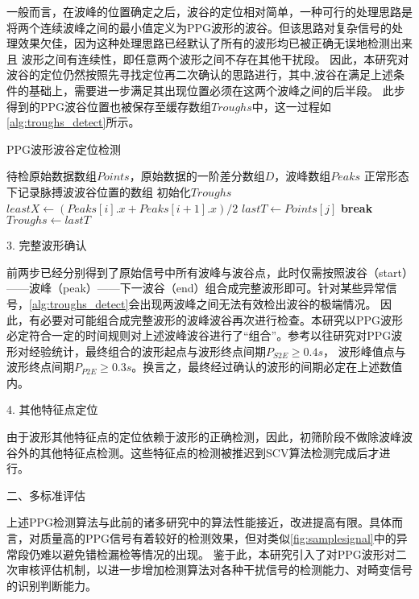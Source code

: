 一般而言，在波峰的位置确定之后，波谷的定位相对简单，一种可行的处理思路是将两个连续波峰之间的最小值定义为PPG波形的波谷。但该思路对复杂信号的处理效果欠佳，因为这种处理思路已经默认了所有的波形均已被正确无误地检测出来且
波形之间有连续性，即任意两个波形之间不存在其他干扰段。
因此，本研究对波谷的定位仍然按照先寻找定位再二次确认的思路进行，其中,波谷在满足上述条件的基础上，需要进一步满足其出现位置必须在这两个波峰之间的后半段。
此步得到的PPG波谷位置也被保存至缓存数组$Troughs$中，这一过程如\autoref{alg:troughs_detect}所示。
\begin{breakablealgorithm}
    \caption{PPG波形波谷定位检测}
    \label{alg:troughs_detect}
    \begin{algorithmic}[1] %
        \Require 待检原始数据数组$Points$，原始数据的一阶差分数组$D$，波峰数组$Peaks$
        \Ensure 正常形态下记录脉搏波波谷位置的数组
            \State 初始化$Troughs$
                \State $leastX \gets (Peaks[i].x + Peaks[i+1].x )/2$
                            \State $lastT \gets Points[j]$
                            \State \textbf{break}
                        \EndIf
                    \EndFor
                \State $Troughs \gets lastT$
            \EndFor
            \State {}
        \EndFunction
    \end{algorithmic}
\end{breakablealgorithm}

3. 完整波形确认

前两步已经分别得到了原始信号中所有波峰与波谷点，此时仅需按照波谷（start）——波峰（peak）——下一波谷（end）组合成完整波形即可。针对某些异常信号，\autoref{alg:troughs_detect}会出现两波峰之间无法有效检出波谷的极端情况。
因此，有必要对可能组合成完整波形的波峰波谷再次进行检查。本研究以PPG波形必定符合一定的时间规则对上述波峰波谷进行了“组合”。参考以往研究对PPG波形对经验统计，最终组合的波形起点与波形终点间期$P_{S2E}\ge 0.4s$，
波形峰值点与波形终点间期$P_{P2E}\ge 0.3s$。换言之，最终经过确认的波形的间期必定在上述数值内。

4. 其他特征点定位

由于波形其他特征点的定位依赖于波形的正确检测，因此，初筛阶段不做除波峰波谷外的其他特征点检测。这些特征点的检测被推迟到SCV算法检测完成后才进行。

二、多标准评估

上述PPG检测算法与此前的诸多研究中的算法性能接近，改进提高有限。具体而言，对质量高的PPG信号有着较好的检测效果，但对类似\autoref{fig:samplesignal}中的异常段仍难以避免错检漏检等情况的出现。
鉴于此，本研究引入了对PPG波形对二次审核评估机制，以进一步增加检测算法对各种干扰信号的检测能力、对畸变信号的识别判断能力。

